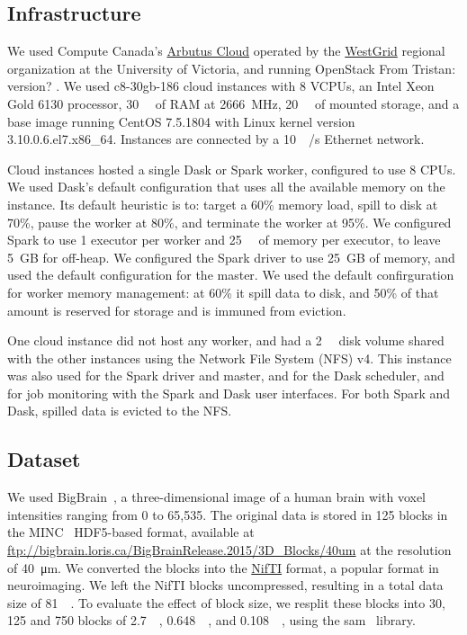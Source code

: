 \documentclass[conference]{IEEEtran}
\newcommand{\TG}[1]{\color{cyan}From Tristan: #1 \color{black}}
\begin{document}
\subsection{Infrastructure}

 We used Compute Canada's
 \href{https://docs.computecanada.ca/wiki/Cloud_resources}{Arbutus Cloud} operated by
 the \href{https://www.westgrid.ca}{WestGrid} regional organization at the University
 of Victoria, and running OpenStack \TG{version?}. We used c8-30gb-186 cloud
 instances with 8 VCPUs, an Intel Xeon Gold 6130 processor, \SI{30}{\giga\byte} of
 RAM at \SI{2666}{\mega\hertz}, \SI{20}{\giga\byte} of mounted storage, and a base
 image running CentOS 7.5.1804 with Linux kernel version
 3.10.0.6.el7.x86\_64. Instances are connected by a
 \SI{10}{\giga\bit/\second} Ethernet network.
 
 Cloud instances hosted a single Dask or Spark worker, configured to use 8 CPUs. We
 used Dask's default configuration that uses all the available memory on the
 instance. Its default heuristic is to: target a 60\% memory load, spill to disk at
 70\%, pause the worker at 80\%, and terminate the worker at 95\%. We configured
 Spark to use 1 executor per worker and \SI{25}{\giga\byte} of memory per executor, to leave 5~GB
 for off-heap. We configured the Spark driver to use 25~GB of memory, and used the
 default configuration for the master. We used the default confirguration for worker
 memory management: at 60\% it spill data to disk, and 50\% of that amount is
 reserved for storage and is immuned from eviction.
 
 One cloud instance did not host any worker, and had a \SI{2}{\tera\byte} disk volume
 shared with the other instances using the Network File System (NFS) v4.
 This instance was also used for the Spark driver and master, and for the
 Dask scheduler, and for job monitoring with the Spark and Dask user
 interfaces. For both Spark and Dask, spilled data is evicted to the NFS.

\subsection{Dataset}

We used BigBrain~\cite{Amunts:13}, a three-dimensional image of a human
brain with voxel intensities ranging from 0 to 65,535. The original data is
stored in 125 blocks in the MINC~\cite{minc} HDF5-based format, available
at \url{ftp://bigbrain.loris.ca/BigBrainRelease.2015/3D_Blocks/40um} at the
resolution of \SI{40}{\micro\metre}. We converted the blocks into the
\href{https://nifti.nimh.nih.gov/nifti-1}{NifTI} format, a popular format
in neuroimaging. We left the NifTI blocks uncompressed, resulting in 
a total data size of \SI{81}{\giga\byte}. 
To evaluate the effect of block size, we resplit these blocks into 30, 125 and 750 blocks of 
\SI{2.7}{\giga\byte}, \SI{0.648}{\giga\byte}, and
\SI{0.108}{\giga\byte}, using the sam~\cite{sam} library.
\end{document}
